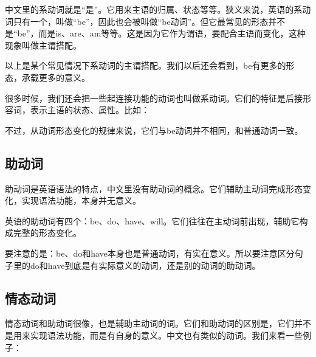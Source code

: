 \documentclass[10.5pt, a4paper]{ctexbook} %
\begin{document}
中文里的系动词就是“是”。它用来主语的归属、状态等等。狭义来说，英语的系动词只有一个，叫做“be”，因此也会被叫做“be动词”。但它最常见的形态并不是“be”，而是is、are、am等等。这是因为它作为谓语，要配合主语而变化，这种现象叫做主谓搭配。

\begin{liju}
\end{liju}

以上是某个常见情况下系动词的主谓搭配。我们以后还会看到，be有更多的形态，承载更多的意义。

很多时候，我们还会把一些起连接功能的动词也叫做系动词。它们的特征是后接形容词，表示主语的状态、属性。比如：

\begin{liju}
\end{liju}

不过，从动词形态变化的规律来说，它们与be动词并不相同，和普通动词一致。

\subsection{助动词}

助动词是英语语法的特点，中文里没有助动词的概念。它们辅助主动词完成形态变化，实现语法功能，本身并无意义。

英语的助动词有四个：be、do、have、will。它们往往在主动词前出现，辅助它构成完整的形态变化。

要注意的是：be、do和have本身也是普通动词，有实在意义。所以要注意区分句子里的do和have到底是有实际意义的动词，还是别的动词的助动词。

\subsection{情态动词}

情态动词和助动词很像，也是辅助主动词的词。它们和助动词的区别是，它们并不是用来实现语法功能，而是有自身的意义。中文也有类似的动词。我们来看一些例子：
\end{document}
